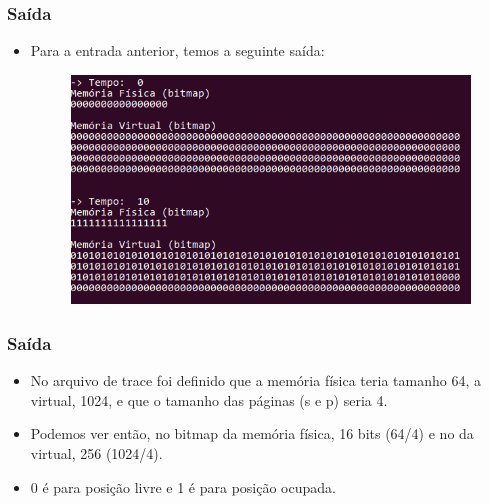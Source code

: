 \documentclass{beamer}
\begin{document}
\begin{frame}
	\frametitle{Saída}
	\begin{itemize}
		\item Para a entrada anterior, temos a seguinte saída:
		\begin{figure}[!h]
			\centering
			\includegraphics[scale=0.5]{b.png}
		\end{figure}		
	\end{itemize}
\end{frame}

\begin{frame}
	\frametitle{Saída}
	\begin{itemize}
		\item No arquivo de trace foi definido que a memória física teria tamanho 64, a virtual, 1024, e que o tamanho das páginas (s e p) seria 4.
		\item Podemos ver então, no bitmap da memória física, 16 bits (64/4) e no da virtual, 256 (1024/4).
		\item 0 é para posição livre e 1 é para posição ocupada.
	\end{itemize}
\end{frame}
\end{document}
